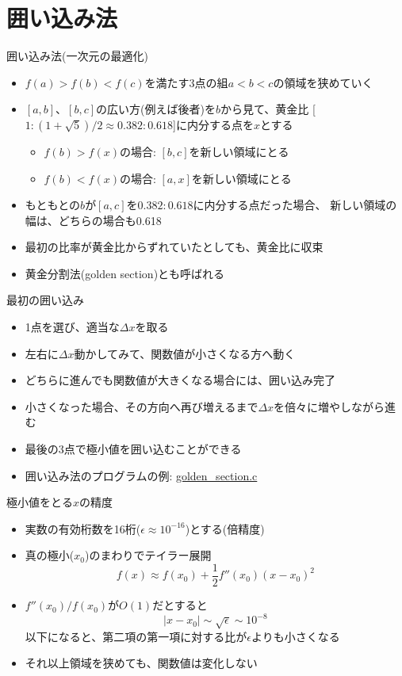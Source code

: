\section{囲い込み法}

\begin{frame}[t,fragile]{囲い込み法(一次元の最適化)}
  \begin{itemize}
    \setlength{\itemsep}{1em}
  \item $f(a) > f(b) < f(c)$を満たす3点の組$a < b < c$の領域を狭めていく
  \item $[a,b]$、$[b,c]$の広い方(例えば後者)を$b$から見て、黄金比
    [$1:(1+\sqrt{5})/2 \approx 0.382:0.618$]に内分する点を$x$とする
    \begin{itemize}
    \item $f(b) > f(x)$の場合: $[b,c]$を新しい領域にとる
    \item $f(b) < f(x)$の場合: $[a,x]$を新しい領域にとる
    \end{itemize}
  \item もともとの$b$が$[a,c]$を$0.382:0.618$に内分する点だった場合、
    新しい領域の幅は、どちらの場合も0.618
  \item 最初の比率が黄金比からずれていたとしても、黄金比に収束
  \item 黄金分割法(golden section)とも呼ばれる
  \end{itemize}
\end{frame}

\begin{frame}[t,fragile]{最初の囲い込み}
  \begin{itemize}
    \setlength{\itemsep}{1em}
  \item 1点を選び、適当な$\Delta x$を取る
  \item 左右に$\Delta x$動かしてみて、関数値が小さくなる方へ動く
  \item どちらに進んでも関数値が大きくなる場合には、囲い込み完了
  \item 小さくなった場合、その方向へ再び増えるまで$\Delta x$を倍々に増やしながら進む
  \item 最後の3点で極小値を囲い込むことができる
  \item 囲い込み法のプログラムの例: \href{https://github.com/todo-group/computer-experiments/blob/master/exercise/optimization/golden_section.c}{golden\_section.c}
  \end{itemize}
\end{frame}

\begin{frame}[t,fragile]{極小値をとる$x$の精度}
  \begin{itemize}
    \setlength{\itemsep}{1em}
  \item 実数の有効桁数を16桁($\epsilon \approx 10^{-16}$)とする(倍精度)
  \item 真の極小($x_0$)のまわりでテイラー展開
    \[
    f(x) \approx f(x_0) + \frac{1}{2} f''(x_0) (x-x_0)^2
    \]
  \item $f''(x_0) / f(x_0)$が$O(1)$だとすると
    \[
    |x-x_0| \sim \sqrt{\epsilon} \sim 10^{-8}
    \]
    以下になると、第二項の第一項に対する比が$\epsilon$よりも小さくなる
  \item それ以上領域を狭めても、関数値は変化しない
  \end{itemize}
\end{frame}
